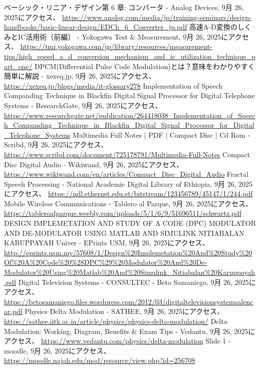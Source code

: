 \documentclass[
  a4paper,  %
  11pt,     %
]{ltjsarticle}%
\begin{document}
\begin{thebibliography}{99}
 ベーシック・リニア・デザイン第 6 章: コンバータ - Analog Devices, 9月 26, 2025にアクセス、 \url{https://www.analog.com/media/jp/training-seminars/design-handbooks/basic-linear-design/EDCh_6_Converter_jp.pdf}
 高速A-D変換のしくみとIC活用術（前編） - Yokogawa Test & Measurement, 9月 26, 2025にアクセス、 \url{https://tmi.yokogawa.com/jp/library/resources/measurement-tips/high_speed_a_d_conversion_mechanism_and_ic_utilization_technique_part_one/}
 DPCM(Differential Pulse Code Modulation)とは？意味をわかりやすく簡単に解説 - xexeq.jp, 9月 26, 2025にアクセス、 \url{https://xexeq.jp/blogs/media/it-glossary278}
 Implementation of Speech Companding Technique in Blackfin Digital Signal Processor for Digital Telephone Systems - ResearchGate, 9月 26, 2025にアクセス、 \url{https://www.researchgate.net/publication/264418038_Implementation_of_Speech_Companding_Technique_in_Blackfin_Digital_Signal_Processor_for_Digital_Telephone_Systems}
 Multimedia Full Notes | PDF | Compact Disc | Cd Rom - Scribd, 9月 26, 2025にアクセス、 \url{https://www.scribd.com/document/725178791/Multimedia-Full-Notes}
 Compact Disc Digital Audio - Wikiwand, 9月 26, 2025にアクセス、 \url{https://www.wikiwand.com/en/articles/Compact_Disc_Digital_Audio}
 Fractal Speech Processing - National Academic Digital Library of Ethiopia, 9月 26, 2025にアクセス、 \url{https://ndl.ethernet.edu.et/bitstream/123456789/45147/1/244.pdf}
 Mobile Wireless Communications - Tablero al Parque, 9月 26, 2025にアクセス、 \url{https://tableroalparque.weebly.com/uploads/5/1/6/9/51696511/schwartz.pdf}
 DESIGN IMPLEMETATION AND STUDY OF A CODE (DPC) MODULATOR AND DE-MODULATOR USING MATLAB AND SIMULINK NITIABALAN KARUPPAYAH Univer - EPrints USM, 9月 26, 2025にアクセス、 \url{http://eprints.usm.my/57608/1/Design%20Implemetation%20And%20Study%20Of%20A%20Code%20%28DPC%29%20Modulator%20And%20De-Modulator%20Using%20Matlab%20And%20Simulink_Nitiabalan%20Karuppayah.pdf}
 Digital Television Systems - CONSULTEC - Beto Samaniego, 9月 26, 2025にアクセス、 \url{https://betosamaniego.files.wordpress.com/2012/03/digitaltelevisionsystemsalencar.pdf}
 Physics Delta Modulation - SATHEE, 9月 26, 2025にアクセス、 \url{https://sathee.iitk.ac.in/article/physics/physics-delta-modulation/}
 Delta Modulation: Working, Diagram, Benefits & Exam Tips - Vedantu, 9月 26, 2025にアクセス、 \url{https://www.vedantu.com/physics/delta-modulation}
 Slide 1 - moodle, 9月 26, 2025にアクセス、 \url{https://moodle.najah.edu/mod/resource/view.php?id=256708}

\end{thebibliography}
\end{document}
